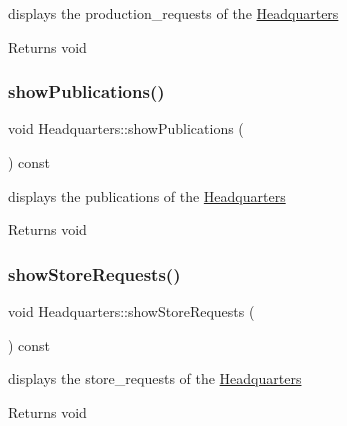 displays the production\+\_\+requests of the \hyperlink{class_headquarters}{Headquarters} 

\begin{DoxyReturn}{Returns}
void 
\end{DoxyReturn}
\mbox{\label{class_headquarters_aabdb893a0704f29221d48d6f1bb61bd6}} 
\subsubsection{\texorpdfstring{show\+Publications()}{showPublications()}}
{\footnotesize\ttfamily void Headquarters\+::show\+Publications (\begin{DoxyParamCaption}{ }\end{DoxyParamCaption}) const}



displays the publications of the \hyperlink{class_headquarters}{Headquarters} 

\begin{DoxyReturn}{Returns}
void 
\end{DoxyReturn}
\mbox{\label{class_headquarters_a57d34b620b22f134ffc64be46b830424}} 
\subsubsection{\texorpdfstring{show\+Store\+Requests()}{showStoreRequests()}}
{\footnotesize\ttfamily void Headquarters\+::show\+Store\+Requests (\begin{DoxyParamCaption}{ }\end{DoxyParamCaption}) const}



displays the store\+\_\+requests of the \hyperlink{class_headquarters}{Headquarters} 

\begin{DoxyReturn}{Returns}
void 
\end{DoxyReturn}
\mbox{\label{class_headquarters_ae1260f49cce6c42face483c597ba1478}} 
